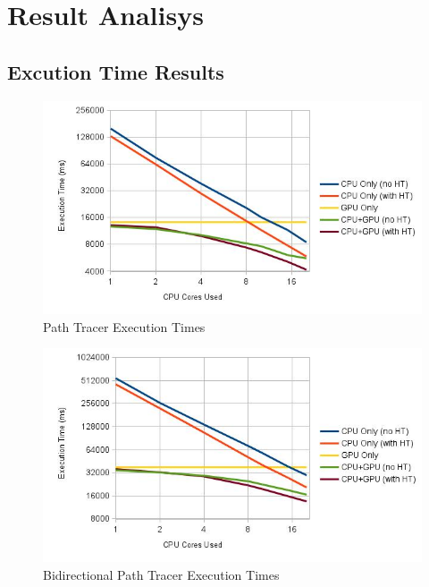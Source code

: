 \section{Result Analisys}

\subsection{Excution Time Results}

\begin{figure}[H]
\includegraphics[width=\linewidth]{img/ptTexec.jpg}
\caption{\label{img:ptTexec} Path Tracer Execution Times}
\end{figure}

\begin{figure}[H]
\includegraphics[width=\linewidth]{img/bptTexec.jpg}
\caption{\label{img:bptTexec} Bidirectional Path Tracer Execution Times}
\end{figure}


